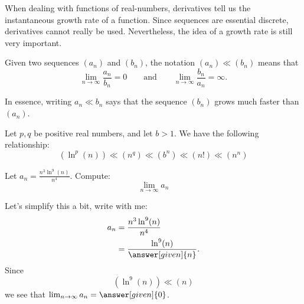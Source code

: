 \documentclass{ximera}
\begin{document}
When dealing with functions of real-numbers, derivatives tell us the
instantaneous growth rate of a function. Since sequences are essential
discrete, derivatives cannot really be used. Nevertheless, the idea of
a growth rate is still very important.

\begin{definition}
  Given two sequences $(a_n)$ and $(b_n)$, the notation $(a_n) \ll
  (b_n)$ means that
  \[
  \lim_{n\to\infty} \frac{a_n}{b_n} =
  0\qquad\text{and}\qquad\lim_{n\to\infty} \frac{b_n}{a_n} =\infty.
  \]
\end{definition}

In essence, writing $a_n \ll b_n$ says that the sequence $(b_n)$ grows
much faster than $(a_n)$.


\begin{theorem}
  Let $p,q$ be positive real numbers, and let $b> 1$. We have the
  following relationship:
  \[
  (\ln^p(n))\ll (n^q) \ll (b^n) \ll (n!) \ll (n^n)
  \]
\end{theorem}

\begin{example}
  Let $a_n  = \frac{n^3\ln^{9}(n)}{n^4}$. Compute:
  \[
  \lim_{n\to \infty}a_n
  \]
  \begin{explanation}
    Let's simplify this a bit, write with me:
    \begin{align*}
      a_n &= \frac{n^3\ln^{9}(n)}{n^4}\\
      &= \frac{\ln^{9}(n)}{\answer[given]{n}}.
    \end{align*}
    Since
    \[
    (\ln^{9}(n))\ll (n)
    \]
    we see that $\lim_{n\to\infty}a_n =\answer[given]{0}$.
  \end{explanation}
\end{example}
\end{document}
